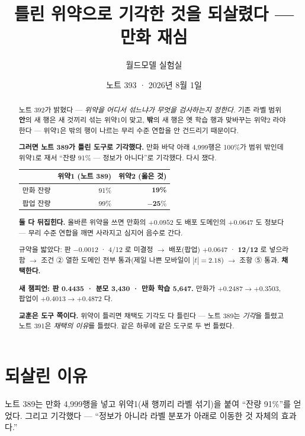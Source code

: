 \documentclass[11pt]{article}
\begin{document}
\title{틀린 위약으로 기각한 것을 되살렸다 --- 만화 재심}
\author{월드모델 실험실}
\date{노트 393 · 2026년 8월 1일}
\maketitle

\begin{abstract}
노트 392가 밝혔다 --- \emph{위약을 어디서 섞느냐가 무엇을 검사하는지
정한다.} 기존 라벨 범위 \textbf{안}의 새 행은 새 것끼리 섞는 위약1이
맞고, \textbf{밖}의 새 행은 옛 학습 행과 맞바꾸는 위약2 라야 한다 ---
위약1은 밖의 행이 나르는 무리 수준 연합을 안 건드리기 때문이다.

\textbf{그러면 노트 389가 틀린 도구로 기각했다.} 만화 바닥 아래 4,999행은
100\%가 범위 밖인데 위약1로 재서 ``잔량 91\% --- 정보가 아니다''로
기각했다. 다시 쟀다.

\begin{center}
\begin{tabular}{lrr}
\hline
 & 위약1 (노트 389) & \textbf{위약2} (옳은 것) \\
\hline
만화 잔량 & 91\% & \textbf{19\%} \\
팝업 잔량 & 99\% & $\mathbf{-25\%}$ \\
\hline
\end{tabular}
\end{center}

\textbf{둘 다 뒤집힌다.} 올바른 위약을 쓰면 만화의 $+0.0952$ 도 배포
도메인의 $+0.0647$ 도 정보다 --- 무리 수준 연합을 깨면 사라지고 심지어
음수로 간다.

규약을 밟았다: 판 $-0.0012$ · 4/12 로 미결정 $\to$ 배포(팝업) $+0.0647$ ·
\textbf{12/12} 로 넣으라 함 $\to$ 조건 ② 열한 도메인 전부 통과(제일 나쁜
모바일이 $|t|{=}2.18$) $\to$ 조항 ⑤ 통과. \textbf{채택한다.}

\textbf{새 챔피언: 판 0.4435 · 분모 3,430 · 만화 학습 5,647.} 만화가
$+0.2487 \to +0.3503$, 팝업이 $+0.4013 \to +0.4872$ 다.

\textbf{교훈은 도구 쪽이다.} 위약이 틀리면 채택도 기각도 다 틀린다 ---
노트 389는 \emph{기각}을 틀렸고 노트 391은 \emph{채택의 이유}를 틀렸다.
같은 하루에 같은 도구로 두 번 틀렸다.
\end{abstract}

\section{되살린 이유}

노트 389는 만화 4,999행을 넣고 위약1(새 행끼리 라벨 섞기)을 붙여
``잔량 91\%''를 얻었다. 그리고 기각했다 --- ``정보가 아니라 라벨 분포가
아래로 이동한 것 자체의 효과다.''
\end{document}
